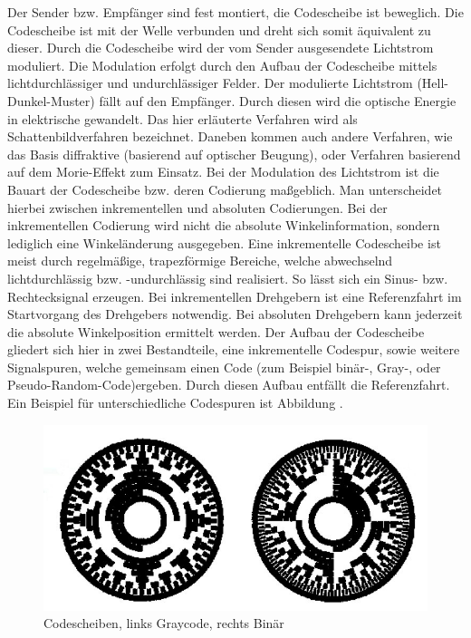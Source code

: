 Der Sender bzw. Empfänger sind fest montiert, die Codescheibe ist beweglich. Die Codescheibe ist mit der Welle verbunden und dreht sich somit äquivalent zu dieser. Durch die Codescheibe wird der vom Sender ausgesendete Lichtstrom moduliert.  Die Modulation erfolgt durch den Aufbau der Codescheibe mittels lichtdurchlässiger und undurchlässiger Felder. Der modulierte Lichtstrom (Hell-Dunkel-Muster) fällt auf den Empfänger. Durch diesen wird die optische Energie in elektrische gewandelt. Das hier erläuterte Verfahren wird als Schattenbildverfahren bezeichnet. Daneben kommen  auch andere Verfahren, wie das Basis diffraktive (basierend auf optischer Beugung), oder Verfahren basierend auf dem Morie-Effekt zum Einsatz.
Bei der Modulation des Lichtstrom ist die Bauart der Codescheibe bzw. deren Codierung maßgeblich. Man unterscheidet hierbei zwischen inkrementellen und absoluten Codierungen. Bei der inkrementellen Codierung wird nicht die absolute Winkelinformation, sondern lediglich eine Winkeländerung ausgegeben. Eine inkrementelle Codescheibe ist meist durch regelmäßige, trapezförmige Bereiche, welche abwechselnd lichtdurchlässig bzw. -undurchlässig sind realisiert. So lässt sich ein Sinus- bzw. Rechtecksignal erzeugen. Bei inkrementellen Drehgebern ist eine Referenzfahrt im Startvorgang des Drehgebers notwendig. Bei absoluten Drehgebern kann jederzeit die absolute Winkelposition ermittelt werden. Der Aufbau der Codescheibe gliedert sich hier in zwei Bestandteile, eine inkrementelle Codespur, sowie weitere Signalspuren, welche gemeinsam einen Code (zum Beispiel binär-, Gray-, oder Pseudo-Random-Code)ergeben. Durch diesen Aufbau entfällt die Referenzfahrt. Ein Beispiel für unterschiedliche Codespuren ist Abbildung \dq {}\dq. 	
\begin{figure}[h]
        \centering
        \includegraphics[width=1\textwidth]{img/Codescheiben.jpg} 
        \caption[Codescheiben, links Graycode, rechts Binär]{Codescheiben, links Graycode, rechts Binär \cite{Dr.MartinDo.11.11.2020}}
        \label{fig:Codescheibe.jpg}
    \end{figure} 

